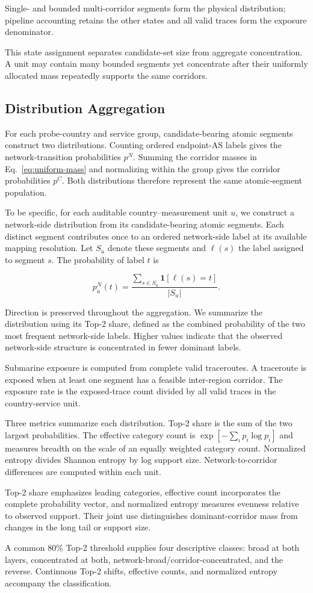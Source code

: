 Single- and bounded multi-corridor segments form the physical distribution;
pipeline accounting retains the other states and all valid traces form the
exposure denominator.

This state assignment separates candidate-set size from aggregate
concentration. A unit may contain many bounded segments yet concentrate after
their uniformly allocated mass repeatedly supports the same corridors.

\subsection{Distribution Aggregation}
\label{sec:framework_distribution_analysis}

For each probe-country and service group, candidate-bearing atomic segments
construct two distributions. Counting ordered endpoint-AS labels gives the
network-transition probabilities \(p^{N}\). Summing the corridor masses in
Eq.~\eqref{eq:uniform-mass} and normalizing within the group gives the corridor
probabilities \(p^{C}\). Both distributions therefore represent the same
atomic-segment population.

To be specific, for each auditable country--measurement unit \(u\), we construct a
network-side distribution from its candidate-bearing atomic segments.
Each distinct segment contributes once to an ordered network-side label
at its available mapping resolution. Let \(S_u\) denote these segments
and \(\ell(s)\) the label assigned to segment \(s\). The probability of
label \(t\) is

\[
p_u^{N}(t)=
\frac{\sum_{s\in S_u}\mathbf{1}[\ell(s)=t]}
{|S_u|}.
\]

Direction is preserved throughout the aggregation. We summarize the
distribution using its Top-2 share, defined as the combined probability
of the two most frequent network-side labels. Higher values indicate
that the observed network-side structure is concentrated in fewer
dominant labels.

Submarine exposure is computed from complete valid traceroutes. A traceroute
is exposed when at least one segment has a feasible inter-region corridor. The
exposure rate is the exposed-trace count divided by all valid traces in the
country-service unit.

Three metrics summarize each distribution. Top-2 share is the sum of the two
largest probabilities. The effective category count is
\(\exp[-\sum_i p_i\log p_i]\) and measures breadth on the scale of an equally
weighted category count. Normalized entropy divides Shannon entropy by log
support size. Network-to-corridor differences are computed within each unit.

Top-2 share emphasizes leading categories, effective count incorporates the
complete probability vector, and normalized entropy measures evenness relative
to observed support. Their joint use distinguishes dominant-corridor mass from
changes in the long tail or support size.

A common 80\% Top-2 threshold supplies four descriptive classes: broad at both
layers, concentrated at both, network-broad/corridor-concentrated, and the
reverse. Continuous Top-2 shifts, effective counts, and normalized entropy
accompany the classification.
